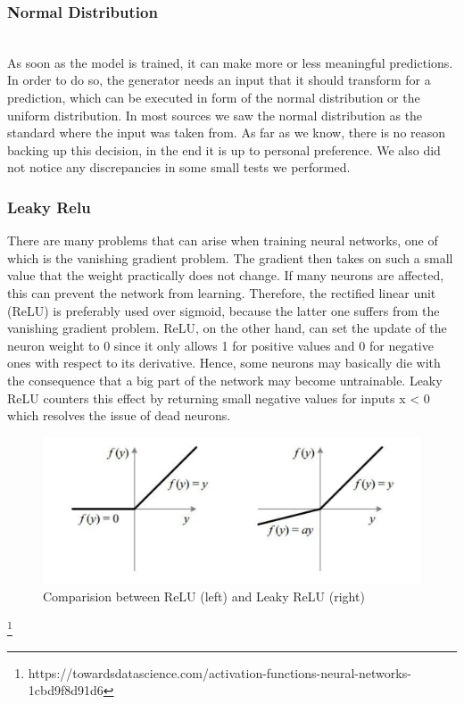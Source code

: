     \subsubsection{Normal Distribution}
    \\
    As soon as the model is trained, it can make more or less meaningful predictions. In order to do so, the generator needs an input that it should transform for a prediction, which can be executed in form of the normal distribution or the uniform distribution. In most sources we saw the normal distribution as the standard where the input was taken from. As far as we know, there is no reason backing up this decision, in the end it is up to personal preference. We also did not notice any discrepancies in some small tests we performed. 
 
    \subsubsection{Leaky Relu}
    There are many problems that can arise when training neural networks, one of which is the vanishing gradient problem. The gradient then takes on such a small value that the weight practically does not change. If many neurons are affected, this can prevent the network from learning. \newline
    Therefore, the rectified linear unit (ReLU) is preferably used over sigmoid, because the latter one suffers from the vanishing gradient problem. ReLU, on the other hand, can set the update of the neuron weight to 0 since it only allows 1 for positive values and 0 for negative ones with respect to its derivative. Hence, some neurons may basically die with the consequence that a big part of the network may become untrainable.
    Leaky ReLU counters this effect by returning small negative values for inputs x < 0 which resolves the issue of dead neurons. 
    
    \begin{figure}[htb] 
    	\centering
    	\includegraphics[width=1.0\linewidth]{Relu.pdf}
    	\caption{Comparision between ReLU (left) and Leaky ReLU (right)}
    	\label{fig:Relu}
    \end{figure}
	\footnote{https://towardsdatascience.com/activation-functions-neural-networks-1cbd9f8d91d6}
    

